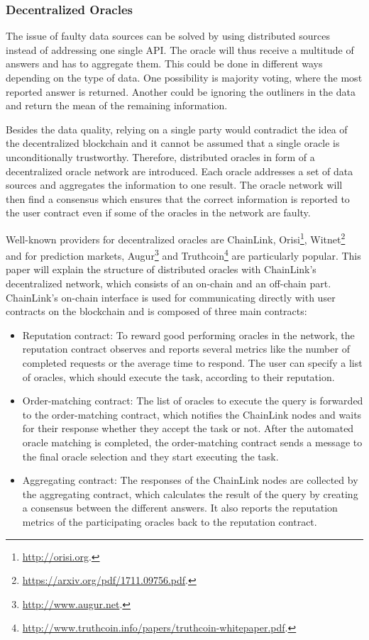 \documentclass[conference]{IEEEtran}
\begin{document}
\subsubsection{Decentralized Oracles}
The issue of faulty data sources can be solved by using distributed sources instead of addressing one single API. The oracle will thus receive a multitude of answers and has to aggregate them. This could be done in different ways depending on the type of data. One possibility is majority voting, where the most reported answer is returned. Another could be ignoring the outliners in the data and return the mean of the remaining information. \cite{Mik2017} \cite{Ellis2017} \par 
Besides the data quality, relying on a single party would contradict the idea of the decentralized blockchain and it cannot be assumed that a single oracle is unconditionally trustworthy. Therefore, distributed oracles in form of a decentralized oracle network are introduced. Each oracle addresses a set of data sources and aggregates the information to one result. The oracle network will then find a consensus which ensures that the correct information is reported to the user contract even if some of the oracles in the network are faulty. \cite{Ellis2017} \par 
Well-known providers for decentralized oracles are ChainLink, Orisi\footnote{\url{http://orisi.org}.}, Witnet\footnote{\url{https://arxiv.org/pdf/1711.09756.pdf}.} and for prediction markets, Augur\footnote{\url{http://www.augur.net}.} and Truthcoin\footnote{\url{http://www.truthcoin.info/papers/truthcoin-whitepaper.pdf}.} are particularly popular. This paper will explain the structure of distributed oracles with ChainLink's decentralized  network, which consists of an on-chain and an off-chain part. ChainLink's on-chain interface is used for communicating directly with user contracts on the blockchain and is composed of three main contracts:
\begin{itemize}
	\item Reputation contract: To reward good performing oracles in the network, the reputation contract observes and reports several metrics like the number of completed requests or the average time to respond. The user can specify a list of oracles, which should execute the task, according to their reputation.
	\item Order-matching contract: The list of oracles to execute the query is forwarded to the order-matching contract, which notifies the ChainLink nodes and waits for their response whether they accept the task or not. After the automated oracle matching is completed, the order-matching contract sends a message to the final oracle selection and they start executing the task.
	\item Aggregating contract: The responses of the ChainLink nodes are collected by the aggregating contract, which calculates the result of the query by creating a consensus between the different answers. It also reports the reputation metrics of the participating oracles back to the reputation contract. \cite{Ellis2017}   
\end{itemize}
\end{document}

